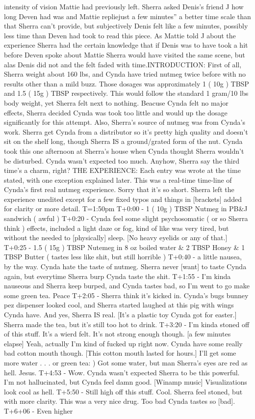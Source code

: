 \documentclass[12pt]{book}
\begin{document}
intensity of vision Mattie had previously left. Sherra asked Denis's friend J how long Deven had was and Mattie repliejust a few minutes'' a better time scale than that Sherra can't provide, but subjectively Denis felt like a few minutes, possibly less time than Deven had took to read this piece. As Mattie told J about the experience Sherra had the certain knowledge that if Denis was to have took a hit before Deven spoke about Mattie Sherra would have visited the same scene, but alas Denis did not and the felt faded with time.INTRODUCTION: First of all, Sherra weight about 160 lbs, and Cynda have tried nutmeg twice before with no results other than a mild buzz. Those dosages was approximately 1 ( 10g ) TBSP and 1.5 ( 15g ) TBSP respectively. This would follow the standard 1 gram/10 lbs body weight, yet Sherra felt next to nothing. Beacuse Cynda felt no major effects, Sherra decided Cynda was took too little and would up the dosage significantly for this attempt. Also, Sherra's source of nutmeg was from Cynda's work. Sherra get Cynda from a distributor so it's pretty high quality and doesn't sit on the shelf long, though Sherra IS a ground/grated form of the nut. Cynda took this one afternoon at Sherra's house when Cynda thought Sherra wouldn't be disturbed. Cynda wasn't expected too much. Anyhow, Sherra say the third time's a charm, right? THE EXPERIENCE: Each entry was wrote at the time stated, with one exception explained later. This was a real-time time-line of Cynda's first real nutmeg experience. Sorry that it's so short. Sherra left the experience unedited except for a few fixed typos and things in [brackets] added for clarity or more detail. T=1:50pm T+0:00 - 1 ( 10g ) TBSP Nutmeg in PB\&J sandwich ( awful ) T+0:20 - Cynda feel some slight psychosomatic ( or so Sherra think ) effects, included a light daze or fog, kind of like was very tired, but without the needed to [physically] sleep. [No heavy eyelids or any of that.] T+0:25 - 1.5 ( 15g ) TBSP Nutemeg in 8 oz boiled water \& 2 TBSP Honey \& 1 TBSP Butter ( tastes less like shit, but still horrible ) T+0:40 - a little nausea, by the way. Cynda hate the taste of nutmeg. Sherra never [want] to taste Cynda again, but everytime Sherra burp Cynda taste the shit. T+1:55 - I'm kinda nauseous and Sherra keep burped, and Cynda tastes bad, so I'm went to go make some green tea. Peace T+2:05 - Sherra think it's kicked in. Cynda's bugs bunney pez dispenser looked cool, and Sherra started laughed at this pig with wings Cynda have. And yes, Sherra IS real. [It's a plastic toy Cynda got for easter.] Sherra made the tea, but it's still too hot to drink. T+3:20 - I'm kinda stoned off of this stuff. It's a wierd felt. It's not strong enough though. [a few minutes elapse] Yeah, actually I'm kind of fucked up right now. Cynda have some really bad cotton mouth though. [This cotton mouth lasted for hours.] I'll get some more water . . .  or green tea: ) Got some water, but man Sherra's eyes are red as hell. Jesus. T+4:53 - Wow. Cynda wasn't expected Sherra to be this powerful. I'm not hallucinated, but Cynda feel damn good. [Winamp music] Visualizations look cool as hell. T+5:50 - Still high off this stuff. Cool. Sherra feel stoned, but with more clarity. This was a very nice drug. Too bad Cynda tastes so [bad]. T+6+06 - Even higher 
\end{document}
